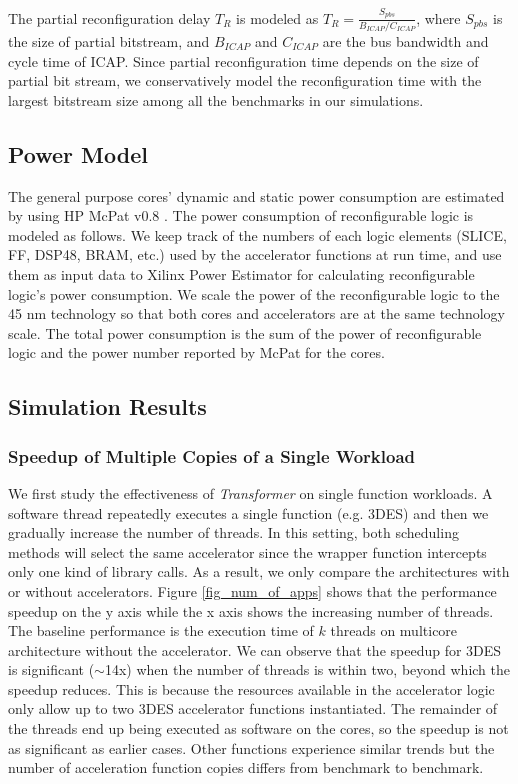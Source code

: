 The partial reconfiguration delay $T_R$ is modeled as $ T_R = \frac{S_{pbs}}{ B_{ICAP} / C_{ICAP}} $,
where $S_{pbs}$ is the size of
partial bitstream, and $B_{ICAP}$ and $C_{ICAP}$ are the bus bandwidth
and cycle time of ICAP.
Since partial reconfiguration time depends on the size of partial bit
stream, we conservatively model the reconfiguration time with the
largest bitstream size among all the benchmarks in our simulations. 


\subsection{Power Model}
The general purpose cores' dynamic and static power consumption are
estimated by using HP McPat v0.8 \cite{mcpat}. The power consumption of reconfigurable logic
is modeled as follows. We keep track of the numbers of
each logic elements (SLICE, FF, DSP48, BRAM, etc.) used by the
accelerator functions at run time, and use them as input data to Xilinx Power Estimator
\cite{xpe} for calculating reconfigurable logic's power consumption.  
We scale the power of the reconfigurable logic to the 45 nm technology
so that both cores and accelerators are at the same technology
scale. The total power consumption is the sum of the power of
reconfigurable logic  and  the power number reported by McPat for the
cores. 


\subsection{Simulation Results}
\label{sec_simu_result}

\subsubsection{Speedup of Multiple Copies of a Single Workload}

We first study the effectiveness of {\em Transformer} on single function 
workloads. A software thread repeatedly executes a single function
(e.g. 3DES) and then we gradually increase the number of threads. In this setting, both 
scheduling methods will select the same accelerator since the wrapper function
intercepts only one kind of library calls. As a result, we only compare the architectures with
or without accelerators. 
Figure \ref{fig_num_of_apps} shows that the performance speedup on the y
axis while the x axis shows the increasing number of threads. The
baseline performance is the execution time of $k$ threads on multicore
architecture without the accelerator. We can
observe that the speedup for 3DES is significant ($\sim$14x) when the number of threads is
within two, beyond which the speedup reduces. This is because the
resources available in the accelerator logic only allow up to two
3DES accelerator functions instantiated. The remainder of the threads
end up being executed as software on the cores, so the speedup is not
as significant as earlier cases.  Other functions
experience similar trends but the number of acceleration function
copies differs from benchmark to benchmark.   


